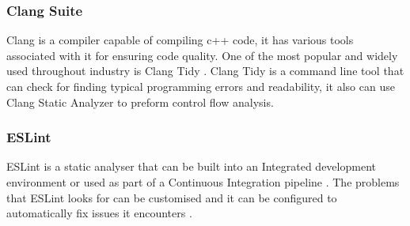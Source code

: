 \subsubsection{\textbf{Clang Suite}}
Clang is a compiler capable of compiling c++ code, it has various tools associated with it for ensuring code quality.
One of the most popular and widely used throughout industry is Clang Tidy \cite{clangTidy}. Clang Tidy is a command line tool that can 
check for finding typical programming errors and readability, it also can use Clang Static Analyzer \cite{clangStatic} to preform control 
flow analysis.
\subsubsection{\textbf{ESLint}}
ESLint is a static analyser that can be built into an Integrated development environment \cite{wiki:Integrated_development_environment} 
or used as part of a Continuous Integration pipeline \cite{wiki:Continuous_integration}. The problems that ESLint looks for can be customised and 
it can be configured to automatically fix issues it encounters \cite{eslint}.


